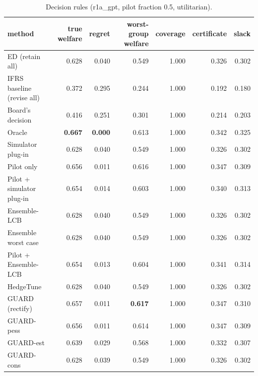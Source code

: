 \begin{table}[t]
\centering
\small
\begin{tabular}{lrrrrrr}
\toprule
method & true welfare & regret & worst-group welfare & coverage & certificate & slack \\
\midrule
ED (retain all) & 0.628 & 0.040 & 0.549 & 1.000 & 0.326 & 0.302 \\
IFRS baseline (revise all) & 0.372 & 0.295 & 0.244 & 1.000 & 0.192 & 0.180 \\
Board's decision & 0.416 & 0.251 & 0.301 & 1.000 & 0.214 & 0.203 \\
Oracle & \textbf{0.667} & \textbf{0.000} & 0.613 & 1.000 & 0.342 & 0.325 \\
Simulator plug-in & 0.628 & 0.040 & 0.549 & 1.000 & 0.326 & 0.302 \\
Pilot only & 0.656 & 0.011 & 0.616 & 1.000 & 0.347 & 0.309 \\
Pilot + simulator plug-in & 0.654 & 0.014 & 0.603 & 1.000 & 0.340 & 0.313 \\
Ensemble-LCB & 0.628 & 0.040 & 0.549 & 1.000 & 0.326 & 0.302 \\
Ensemble worst case & 0.628 & 0.040 & 0.549 & 1.000 & 0.326 & 0.302 \\
Pilot + Ensemble-LCB & 0.654 & 0.013 & 0.604 & 1.000 & 0.341 & 0.314 \\
HedgeTune & 0.628 & 0.040 & 0.549 & 1.000 & 0.326 & 0.302 \\
GUARD (rectify) & 0.657 & 0.011 & \textbf{0.617} & 1.000 & 0.347 & 0.310 \\
GUARD-pess & 0.656 & 0.011 & 0.614 & 1.000 & 0.347 & 0.309 \\
GUARD-est & 0.639 & 0.029 & 0.568 & 1.000 & 0.332 & 0.307 \\
GUARD-cons & 0.628 & 0.039 & 0.549 & 1.000 & 0.326 & 0.302 \\
\bottomrule
\end{tabular}
\caption{Decision rules (r1a\_gpt, pilot fraction 0.5, utilitarian).}
\label{tab:methods-utilitarian}
\end{table}
